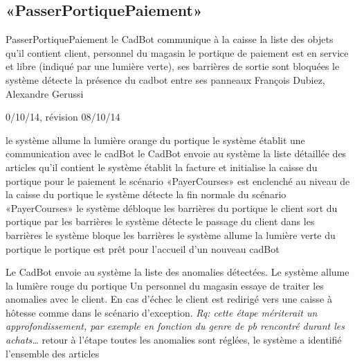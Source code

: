 ﻿%
\subsection{«PasserPortiquePaiement»}

\startCU
\nom PasserPortiquePaiement
\but le CadBot communique à la caisse la liste des objets qu'il contient
\acteur client, personnel du magasin
\precondition le portique de paiement est en service et libre (indiqué par une lumière verte), ses barrières de sortie sont bloquées
\declenchement le système détecte la présence du cadbot entre ses panneaux
\auteur François Dubiez, Alexandre Gerussi
\date 30/10/14, révision 08/10/14

\nominal %
\startnominal
\etape le système allume la lumière orange du portique
 le système établit une communication avec le cadBot
 le CadBot envoie au système la liste détaillée des articles qu'il contient
 le système établit la facture et initialise la caisse du portique pour le paiement
\etape le scénario «PayerCourses» est enclenché au niveau de la caisse du portique
\etape le système détecte la fin normale du scénario «PayerCourses»
\etape le système débloque les barrières du portique
\etape le client sort du portique par les barrières
 le système détecte le passage du client dans les barrières
 le système bloque les barrières
\etape le système allume la lumière verte du portique
\stopnominal
\postcondition le portique est prêt pour l'accueil d'un nouveau cadBot

\alternatifs %

  \etape Le CadBot envoie au système la liste des anomalies détectées.
  \etape Le système allume la lumière rouge du portique
  \etape Un personnel du magasin essaye de traiter les anomalies avec le client. En cas d'échec le client est redirigé vers une caisse à hôtesse comme dans le scénario d'exception. {\it Rq: cette étape mériterait un approfondissement, par exemple en fonction du genre de pb rencontré durant les achats\dots}
  \etape retour à l'étape 
\stopcondition
\postcondition toutes les anomalies sont réglées, le système a identifié l'ensemble des articles
\stopalternatif

